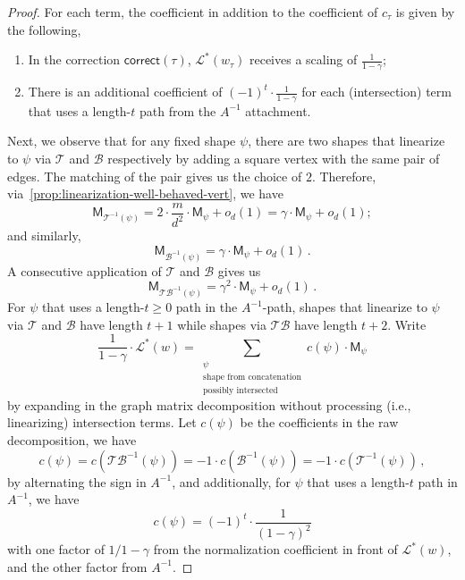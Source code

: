 \documentclass[12pt]{article}
\newcommand{\gam}{\gamma}
\newcommand{\cm}{\mathsf{M} }
\newcommand{\corr}{\mathsf{correct}}
\newcommand{\calL}{\mathcal{L}}
\begin{document}
\begin{proof}
For each term, the coefficient in addition to the coefficient of $c_\tau$ is given by the following,
\begin{enumerate}
	\item In the correction $\corr(\tau)$, $\mathcal{L}^*(w_\tau)$ receives a scaling of $  \frac{1}{1-\gam } $;
	\item There is an additional coefficient of $(-1)^t \cdot \frac{1}{1-\gamma}$ for each (intersection) term that uses a length-$t$ path from the $A^{-1}$ attachment.
\end{enumerate}
Next, we observe that for any fixed shape $\psi$, there are two shapes that linearize to $\psi$ via $\mathcal{T}$ and $\mathcal{B}$ respectively by adding a square vertex with the same pair of edges. The matching of the pair gives us the choice of $2$. Therefore, via~\cref{prop:linearization-well-behaved-vert}, we have \[ 
\cm_{\mathcal{T}^{-1}(\psi)} = 2\cdot \frac{m}{d^2} \cdot \cm_{\psi} +o_d(1) = \gam \cdot \cm_{\psi}+o_d(1);
\]
and similarly,
\[ 
\cm_{\mathcal{B}^{-1}(\psi)} = \gam \cdot \cm_{\psi}+o_d(1)\,.
\]
A consecutive application of $\mathcal{T}$ and $\mathcal{B}$ gives us \[ 
\cm_{\mathcal{TB}^{-1}(\psi)} = \gam^2 \cdot \cm_{\psi}+o_d(1)\,.
\]
For $\psi$ that uses a length-$t\geq 0$ path in the $A^{-1}$-path, shapes that linearize to $\psi$ via $\mathcal{T}$ and $\mathcal{B}$ have length $t+1$ while shapes via $\mathcal{TB}$ have length $t+2$. Write \[ 
\frac{1}{1-\gam} \cdot  \mathcal{L}^*(w) = \sum_{\substack{\psi \\ \text{shape from concatenation} \\ \text{possibly intersected} }} c(\psi) \cdot \cm_\psi 
\]
by expanding in the graph matrix decomposition without processing (i.e., linearizing) intersection terms. Let $c(\psi)$ be the coefficients in the raw decomposition, we have \[ 
c(\psi) = c(\mathcal{TB}^{-1}(\psi)) = -1\cdot c(\mathcal{B}^{-1}(\psi)) = -1\cdot c(\mathcal{T}^{-1}(\psi))  \,,
\]
by alternating the sign in $A^{-1}$, and additionally, for $\psi$ that uses a length-$t$ path in $A^{-1}$, we have\[
c(\psi) = (-1)^t\cdot \frac{1}{(1-\gam)^2}
\]
with one factor of $1/1-\gam$ from the normalization coefficient in front of $\calL^*(w)$, and the other factor from $A^{-1}$. 


\end{proof}
\end{document}
